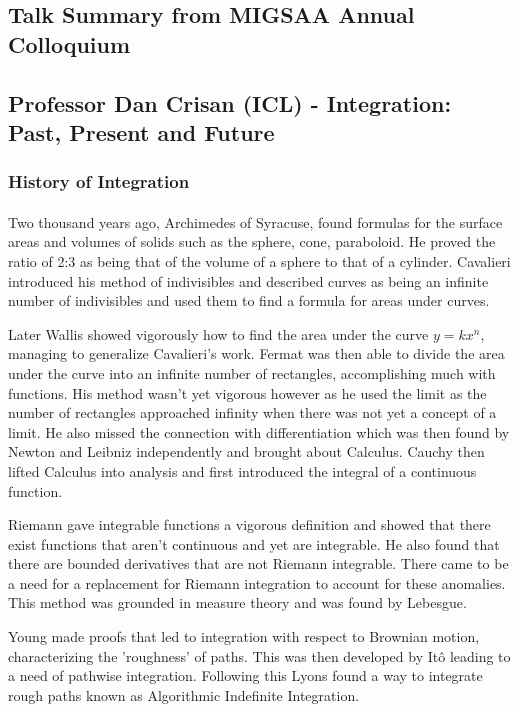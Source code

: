 \documentclass[12pt,a4paper]{article}
\begin{document}

\begin{addmargin}[-6em]{-6em}	
	\section*{Talk Summary from MIGSAA Annual Colloquium}
	\subsection*{Professor Dan Crisan (ICL) - Integration: Past, Present and Future}	
	\subsubsection*{History of Integration}
	\vspace{-3mm}
	\paragraph{} Two thousand years ago, Archimedes of Syracuse, found formulas for the surface areas and volumes of solids such as the sphere, cone, paraboloid. He proved the ratio of 2:3 as being that of the volume of a sphere to that of a cylinder.	Cavalieri introduced his method of indivisibles and described curves as being an infinite number of indivisibles and used them to find a formula for areas under curves.
	
	Later Wallis showed vigorously how to find the area under the curve $y=kx^n$, managing to generalize Cavalieri's work. Fermat was then able to divide the area under the curve into an infinite number of rectangles, accomplishing much with functions. His method wasn't yet vigorous however as he used the limit as the number of rectangles approached infinity when there was not yet a concept of a limit. He also missed the connection with differentiation which was then found by Newton and Leibniz independently and brought about Calculus.	Cauchy then lifted Calculus into analysis and first introduced the integral of a continuous function.
	
	Riemann gave integrable functions a vigorous definition and showed that there exist functions that aren't continuous and yet are integrable. He also found that there are bounded derivatives that are not Riemann integrable. There came to be a need for a replacement for Riemann integration to account for these anomalies. This method was grounded in measure theory and was found by Lebesgue.
	
	Young made proofs that led to integration with respect to Brownian motion, characterizing the 'roughness' of paths. This was then developed by It\^{o} leading to a need of pathwise integration. Following this Lyons found a way to integrate rough paths known as Algorithmic Indefinite Integration.
	

\end{addmargin}
\end{document}
